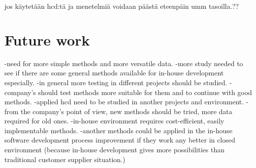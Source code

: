 \documentclass[12pt,a4paper,oneside,pdftex]{report}
\begin{document}
jos käytetään hcd:tä ja menetelmiä voidaan päästä eteenpäin umm tasoilla.??
        \section{Future work}
	\label{sec:future}
	-need for more simple methods and more versatile data.
	-more study needed to see if there are some general methods available for in-house development especially.
	-in general more testing in different projects should be studied. 
	-company's should test methods more suitable for them and to continue with good methods.
	-applied hcd need to be studied in another projects and environment.
	-from the company's point of view, new methods should be tried, more data required for old ones. 
	-in-house environment requires cost-efficient, easily implementable methods.
	-another methods could be applied in the in-house software development process improvement if they work any better in closed environment (because in-house development gives more possibilities than traditional customer supplier situation.)



% 


    


% 




% 

\appendix

\end{document}
